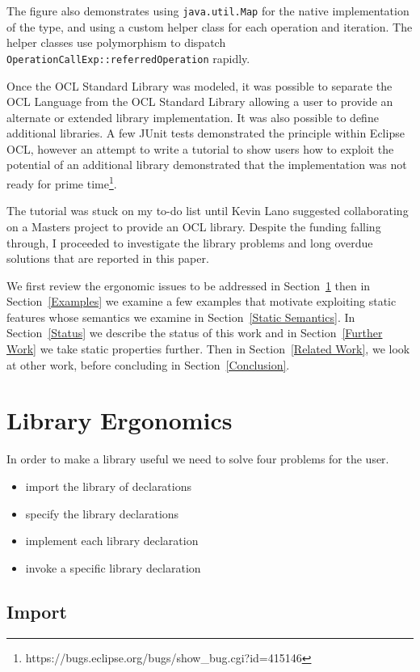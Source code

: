 \documentclass[sigconf]{acmart}
\begin{document}
The figure also demonstrates using \verb|java.util.Map| for the native implementation of the type, and using a custom helper class for each operation and iteration. The helper classes use polymorphism to dispatch \verb|OperationCallExp::referredOperation| rapidly.

Once the OCL Standard Library was modeled, it was possible to separate the OCL Language from the OCL Standard Library allowing a user to provide an alternate or extended library implementation. It was also possible to define additional libraries. A few JUnit tests demonstrated the principle within Eclipse OCL, however an attempt to write a tutorial to show users how to exploit the potential of an additional library demonstrated that the implementation was not ready for prime time\footnote{https://bugs.eclipse.org/bugs/show\_bug.cgi?id=415146}.

The tutorial was stuck on my to-do list until Kevin Lano suggested collaborating on a Masters project to provide an OCL library. Despite the funding falling through, I proceeded to investigate the library problems and long overdue solutions that are reported in this paper.

We first review the ergonomic issues to be addressed in Section~\ref{Library Ergonomics} then in Section~\ref{Examples} we examine a few examples that motivate exploiting static features whose semantics we examine in Section~\ref{Static Semantics}. In Section~\ref{Status} we describe the status of this work and in Section~\ref{Further Work} we take static properties further. Then in Section~\ref{Related Work}, we look at other work, before concluding in Section~\ref{Conclusion}.
  
\section{Library Ergonomics}\label{Library Ergonomics}
 
In order to make a library useful we need to solve four problems for the user.

\begin{itemize}
	\item import the library of declarations
	\item specify the library declarations
	\item implement each library declaration
	\item invoke a specific library declaration
\end{itemize}

\subsection{Import}
 
\end{document}
